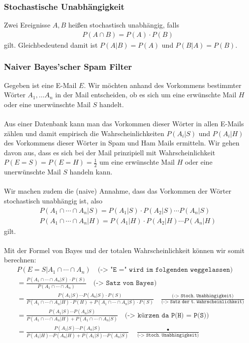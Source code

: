 \documentclass[a4paper]{article}
\begin{document}
\subsubsection{Stochastische Unabhängigkeit}
Zwei Ereignisse $A,B$ heißen stochastisch unabhängig, falls
\begin{align*}
P(A \cap B) = P(A) \cdot P(B)
\end{align*}
gilt.  Gleichbedeutend damit ist  $P(A | B) = P(A)$ und $P(B  | A) = P(B)$.
\newpage
\subsubsection{Naiver Bayes'scher Spam Filter}
Gegeben ist eine E-Mail $E$.  Wir möchten anhand des Vorkommens bestimmter Wörter $A_1, \ldots A_n$ in der Mail entscheiden, ob es sich um eine erwünschte Mail $H$ oder eine unerwünschte Mail $S$ handelt.\\\\
Aus einer Datenbank kann man das Vorkommen dieser Wörter in allen E-Mails zählen und damit empirisch die Wahrscheinlichkeiten $P(A_i | S)$ und $P(A_i | H) $ des Vorkommens dieser Wörter in Spam und Ham Mails ermitteln.  Wir gehen davon aus, dass es sich bei der Mail  prinzipiell mit  Wahrscheinlichkeit $P(E= S) = P(E= H)= \frac{1}{2}$  um eine erwünschte  Mail $H$ oder eine unerwünschte Mail $S$  handeln kann. \\\\
 Wir machen zudem die (naive) Annahme, dass das Vorkommen der Wörter  stochastisch unabhängig ist, also 
\begin{align*}
P(A_1 \cap \cdots \cap A_n | S) = P(A_1 | S) \cdot P(A_2 | S) \cdots P(A_n | S) \\
P(A_1 \cap \cdots \cap A_n | H) = P(A_1 | H) \cdot P(A_2 | H) \cdots P(A_n | H)
\end{align*}
gilt.\\\\
Mit der Formel von Bayes und der totalen Wahrscheinlichkeit  können wir somit berechnen:
\begin{align*}
& P(E=S |  A_1 \cap \cdots \cap A_n) \quad \texttt{(-> "E =" wird im folgenden weggelassen)}\\[5pt]
&= \frac{P(A_1 \cap \cdots \cap A_n | S) \cdot P(S)}{P(A_1 \cap \cdots \cap A_n)} \quad \texttt{(-> Satz von Bayes)}\\[5pt]
&=  \frac{P(A_1 | S) \cdots P(A_n | S) \cdot P(S)}{P(A_1 \cap \cdots \cap A_n | H) \cdot P(H) + P(A_1 \cap \cdots \cap A_n | S) \cdot P(S)} \quad \frac{\texttt{(-> Stoch. Unabhängigkeit)}}{\texttt{(-> Satz der t. Wahrscheinlichkeit)}} \\[5pt]
&=  \frac{P(A_1 | S) \cdots P(A_n | S)}{P(A_1 \cap \cdots \cap A_n | H) + P(A_1 \cap \cdots \cap A_n | S)} \quad \texttt{(-> kürzen da P(H) = P(S))} \\[5pt]
&=  \frac{P(A_1 | S) \cdots P(A_n | S)}{P(A_1 | H) \cdots P(A_n | H)  + P(A_1 | S) \cdots P(A_n | S) } \quad \frac{•}{\texttt{(-> Stoch. Unabhängigkeit)}} \\
\end{align*}
\end{document}
